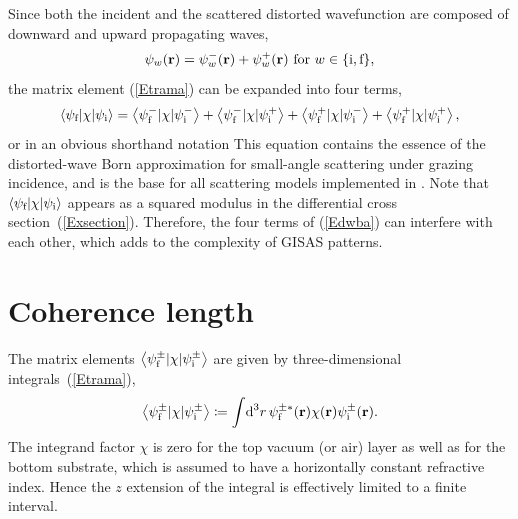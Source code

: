 Since both the incident
and the scattered distorted wavefunction
are composed of downward and upward propagating waves,
\begin{equation}\label{Epsipm}
  \psi_w(\mathbf{r})
  = \psi^-_w(\mathbf{r}) + \psi^+_w(\mathbf{r})\text{~for~}w\in\{\text{i},\text{f}\},
\end{equation}
%
the matrix element (\ref{Etrama})
can be expanded into four terms,
\begin{equation}\label{Edwba4}
  \left\langle \psi_{\text{f}}|\chi|\psi_{\text{i}}\right\rangle
  = \left\langle \psi^-_{\text{f}}|\chi|\psi^-_{\text{i}}\right\rangle
  + \left\langle \psi^-_{\text{f}}|\chi|\psi^+_{\text{i}}\right\rangle
  + \left\langle \psi^+_{\text{f}}|\chi|\psi^-_{\text{i}}\right\rangle
  + \left\langle \psi^+_{\text{f}}|\chi|\psi^+_{\text{i}}\right\rangle,
\end{equation}
%
%
or in an obvious shorthand notation
This equation contains the essence of
the distorted-wave Born approximation
for small-angle scattering under grazing incidence,
and is the base for all scattering models implemented in \BornAgain.
Note that $\left\langle \psi_{\text{f}}|\chi|\psi_{\text{i}}\right\rangle$
appears as a squared modulus
in the differential cross section~(\ref{Exsection}).
Therefore, the four terms of (\ref{Edwba}) can interfere with each other,
which adds to the complexity of GISAS patterns.

%


\section{Coherence length}\label{Scoherlen}

The matrix elements $\left\langle \psi^\pm_{\text{f}}|\chi|\psi^\pm_{\text{i}}\right\rangle$
are given by three-dimensional integrals~(\ref{Etrama}),
\begin{equation}\label{Etrama3}
  \left\langle \psi_{\text{f}}^\pm|\chi|\psi_{\text{i}}^\pm\right\rangle
  \coloneqq  \int\!\text{d}^3r\, \psi^{\pm*}_{\text{f}}(\mathbf{r})\chi(\mathbf{r})\psi^\pm_{\text{i}}(\mathbf{r}).
\end{equation}
The integrand factor $\chi$ is zero for
the top vacuum (or air) layer as well as for the bottom substrate,
which is assumed to have a horizontally constant refractive index.
Hence the $z$ extension of the integral is effectively limited
to a finite interval.

